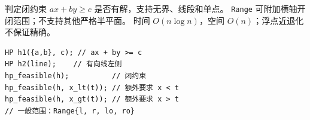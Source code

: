 \noindent
判定闭约束 $ax+by\ge c$ 是否有解，支持无界、线段和单点。
\texttt{Range} 可附加横轴开闭范围；不支持其他严格半平面。
时间 $O(n\log n)$，空间 $O(n)$；浮点近退化不保证精确。
\begin{verbatim}
HP h1({a,b}, c); // ax + by >= c
HP h2(line);    // 有向线左侧
hp_feasible(h);          // 闭约束
hp_feasible(h, x_lt(t)); // 额外要求 x < t
hp_feasible(h, x_gt(t)); // 额外要求 x > t
// 一般范围：Range{l, r, lo, ro}
\end{verbatim}
